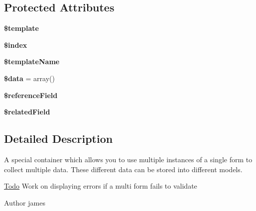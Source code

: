 \subsection*{Protected Attributes}
\begin{DoxyCompactItemize}
\item 
\hypertarget{class_multi_elements_ae4fd7ce1911806683f41ceccbba86b79}{
{\bfseries \$template}}
\label{class_multi_elements_ae4fd7ce1911806683f41ceccbba86b79}

\item 
\hypertarget{class_multi_elements_a17b1ea3e770fa9ffa733e97d28c6bc56}{
{\bfseries \$index}}
\label{class_multi_elements_a17b1ea3e770fa9ffa733e97d28c6bc56}

\item 
\hypertarget{class_multi_elements_a9c49531fd636f3dffb6cce1704dc4a2a}{
{\bfseries \$templateName}}
\label{class_multi_elements_a9c49531fd636f3dffb6cce1704dc4a2a}

\item 
\hypertarget{class_multi_elements_aea9ef5ad730038fc72479f84921a37af}{
{\bfseries \$data} = array()}
\label{class_multi_elements_aea9ef5ad730038fc72479f84921a37af}

\item 
\hypertarget{class_multi_elements_acf590c553533f560c89bb8054a7bd15e}{
{\bfseries \$referenceField}}
\label{class_multi_elements_acf590c553533f560c89bb8054a7bd15e}

\item 
\hypertarget{class_multi_elements_ab634de63ecb3726b095bd297d476e783}{
{\bfseries \$relatedField}}
\label{class_multi_elements_ab634de63ecb3726b095bd297d476e783}

\end{DoxyCompactItemize}


\subsection{Detailed Description}
A special container which allows you to use multiple instances of a single form to collect multiple data. These different data can be stored into different models.

\begin{Desc}
\item[\hyperlink{todo__todo000387}{Todo}]Work on displaying errors if a multi form fails to validate \end{Desc}
\begin{DoxyAuthor}{Author}
james 
\end{DoxyAuthor}


